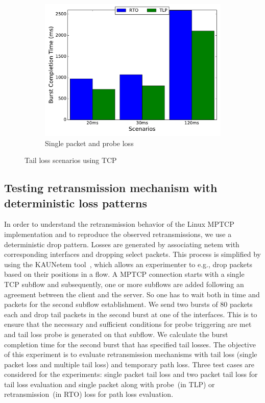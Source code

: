 \documentclass[10pt,conference]{IEEEtran}
\begin{document}
\begin{figure}
\begin{subfigure}{0.32\textwidth}
	\includegraphics[angle=0, width=\textwidth, natwidth=578.16,natheight=433.62]{plots/T1PP.pdf}
	\caption{Single packet and probe loss }\label{t1pp}
 \end{subfigure}
 \caption{Tail loss scenarios using TCP}\label{tcpf}
\end{figure}

\subsection{Testing retransmission mechanism with deterministic loss patterns}
In order to understand the retransmission behavior of the Linux MPTCP implementation and to reproduce the observed retransmissions, we use a 
deterministic drop pattern. Losses are generated by associating netem with corresponding interfaces and dropping select packets. This process 
is simplified by using the KAUNetem tool~\cite{Garcia2016}, which allows an experimenter to e.g., drop packets based on their positions in a flow. 
A MPTCP connection starts with a single TCP subflow and subsequently, one or more subflows are added following an agreement between the client 
and the server. So one has to wait both in time and packets for the second subflow establishment. We send two bursts of 80 packets each and drop 
tail packets in the second burst at one of the interfaces. This is to ensure that the necessary and sufficient conditions for probe triggering 
are met and tail loss probe is generated on that subflow. We calculate the burst completion time for the second burst that has specified tail 
losses. The objective of this experiment is to evaluate retransmission mechanisms with tail loss (single packet loss and multiple tail loss) and 
temporary path loss. Three test cases are considered for the experiments: single packet tail loss and two packet tail loss for tail loss evaluation 
and single packet along with probe~(in TLP) or retransmission~(in RTO) loss for path loss evaluation. 
\end{document}
